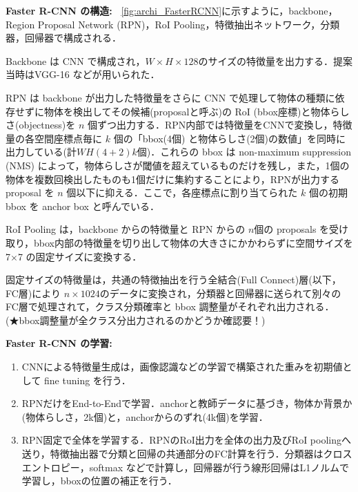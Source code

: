 \documentclass[originalpaper]{jsaiart}     %
\begin{document}
{\bf Faster R-CNN の構造:\ } \ref{fig:archi_FasterRCNN}に示すように，backbone，Region Proposal Network (RPN)，RoI Pooling，特徴抽出ネットワーク，分類器，回帰器で構成される．

Backbone は CNN で構成され，$W{\times}H{\times}128$のサイズの特徴量を出力する．提案当時はVGG-16 \cite{SimZis15}などが用いられた．

RPN は backbone が出力した特徴量をさらに CNN で処理して物体の種類に依存せずに物体を検出してその候補(proposalと呼ぶ)の RoI (bbox座標)と物体らしさ(objectness)を $n$ 個ずつ出力する．RPN内部では特徴量をCNNで変換し，特徴量の各空間座標点毎に $k$ 個の「bbox(4個) と物体らしさ(2個)の数値」を同時に出力している(計$WH(4{+}2)k$個)．これらの bbox は non-maximum suppression (NMS) によって，物体らしさが閾値を超えているものだけを残し，また，1個の物体を複数回検出したものも1個だけに集約することにより，RPNが出力するproposal を $n$ 個以下に抑える．ここで，各座標点に割り当てられた $k$ 個の初期 bbox を anchor box と呼んでいる．

RoI Pooling は，backbone からの特徴量と RPN からの $n$個の proposals を受け取り，bbox内部の特徴量を切り出して物体の大きさにかかわらずに空間サイズを 7{$\times$}7 の固定サイズに変換する．

固定サイズの特徴量は，共通の特徴抽出を行う全結合(Full Connect)層(以下，FC層)により $n{\times}1024$のデータに変換され，分類器と回帰器に送られて別々のFC層で処理されて，クラス分類確率と bbox 調整量がそれぞれ出力される．(★bbox調整量が全クラス分出力されるのかどうか確認要！)

{\bf Faster R-CNN の学習:\ } 
\begin{enumerate}
    \item CNNによる特徴量生成は，画像認識などの学習で構築された重みを初期値として fine tuning を行う．
    \item RPNだけをEnd-to-Endで学習．anchorと教師データに基づき，物体か背景か(物体らしさ，2k個)と，anchorからのずれ(4k個)を学習．
    \item RPN固定で全体を学習する．RPNのRoI出力を全体の出力及びRoI poolingへ送り，特徴抽出器で分類と回帰の共通部分のFC計算を行う．分類器はクロスエントロピー，softmax などで計算し，回帰器が行う線形回帰はL1ノルムで学習し，bboxの位置の補正を行う．
\end{enumerate}
\end{document}
